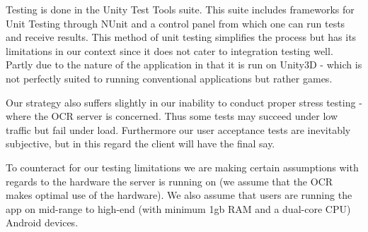 \documentclass[a4paper,12pt]{article}
\begin{document}
Testing is done in the Unity Test Tools suite. This suite includes frameworks for Unit Testing through NUnit and a control panel from which one can run tests and receive results. This method of unit testing simplifies the process but has its limitations in our context since it does not cater to integration testing well. Partly due to the nature of the application in that it is run on Unity3D - which is not perfectly suited to running conventional applications but rather games. 

Our strategy also suffers slightly in our inability to conduct proper stress testing - where the OCR server is concerned. Thus some tests may succeed under low traffic but fail under load. Furthermore our user acceptance tests are inevitably subjective, but in this regard the client will have the final say.

To counteract for our testing limitations we are making certain assumptions with regards to the hardware the server is running on (we assume that the OCR makes optimal use of the hardware). We also assume that users are running the app on mid-range to high-end (with minimum 1gb RAM and a dual-core CPU) Android devices.
\end{document}
